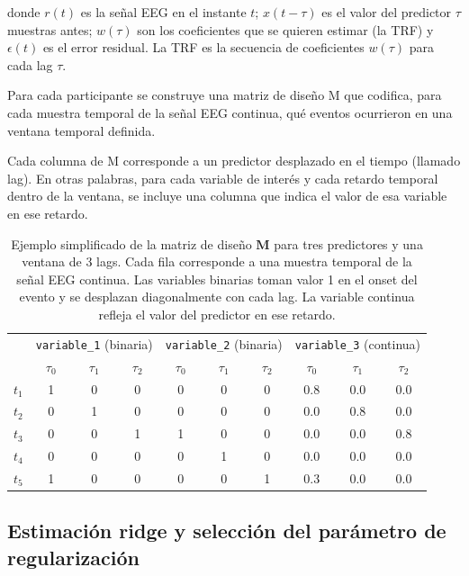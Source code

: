 donde $r(t)$ es la señal EEG en el instante $t$; $x(t-\tau)$ es el valor del predictor $\tau$ muestras antes; $w(\tau)$ son los coeficientes que se quieren estimar (la TRF) y $\epsilon(t)$ es el error residual. La TRF es la secuencia de coeficientes $w(\tau)$ para cada lag $\tau$.

Para cada participante se construye una matriz de diseño M que codifica, para cada muestra temporal de la señal EEG continua, qué eventos ocurrieron en una ventana temporal definida. 

Cada columna de M corresponde a un predictor desplazado en el tiempo (llamado lag). En otras palabras, para cada variable de interés y cada retardo temporal dentro de la ventana, se incluye una columna que indica el valor de esa variable en ese retardo.

\begin{table}[h]
\centering
\small
\begin{tabular}{c|ccc|ccc|ccc}
\toprule
 & \multicolumn{3}{c|}{\texttt{variable\_1} (binaria)} & \multicolumn{3}{c|}{\texttt{variable\_2} (binaria)} & \multicolumn{3}{c}{\texttt{variable\_3} (continua)} \\
 & $\tau_0$ & $\tau_1$ & $\tau_2$ & $\tau_0$ & $\tau_1$ & $\tau_2$ & $\tau_0$ & $\tau_1$ & $\tau_2$ \\
\midrule
$t_1$ & 1 & 0 & 0 & 0 & 0 & 0 & 0.8 & 0.0 & 0.0 \\
$t_2$ & 0 & 1 & 0 & 0 & 0 & 0 & 0.0 & 0.8 & 0.0 \\
$t_3$ & 0 & 0 & 1 & 1 & 0 & 0 & 0.0 & 0.0 & 0.8 \\
$t_4$ & 0 & 0 & 0 & 0 & 1 & 0 & 0.0 & 0.0 & 0.0 \\
$t_5$ & 1 & 0 & 0 & 0 & 0 & 1 & 0.3 & 0.0 & 0.0 \\
\bottomrule
\end{tabular}
\caption{Ejemplo simplificado de la matriz de diseño $\mathbf{M}$ para tres predictores y una ventana de 3 lags. Cada fila corresponde a una muestra temporal de la señal EEG continua. Las variables binarias toman valor 1 en el onset del evento y se desplazan diagonalmente con cada lag. La variable continua refleja el valor del predictor en ese retardo.}
\label{tab:matriz_disenio}
\end{table}

\subsection{Estimación ridge y selección del parámetro de regularización}

